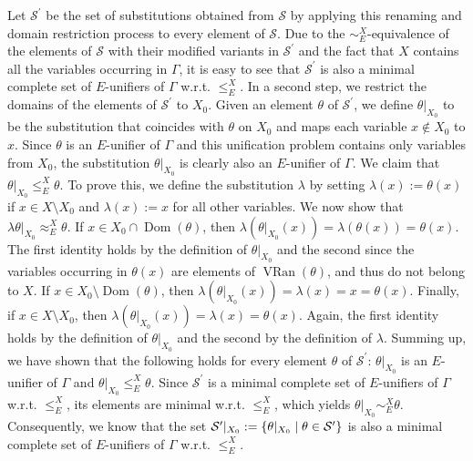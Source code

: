  
 
Let $\mathcal{S}^{\prime}$ be the set of substitutions obtained from $\mathcal{S}$ by applying this renaming and domain restriction process to every element of $\mathcal{S}$. Due to the $\sim_{E}^{X}$-equivalence of the elements of $\mathcal{S}$ with their modified variants in $\mathcal{S}^{\prime}$ and the fact that $X$ contains all the variables occurring in $\Gamma$, it is easy to see that $\mathcal{S}^{\prime}$ is also a minimal complete set of $E$-unifiers of $\Gamma$ w.r.t. $\leq_{E}^{X}$. In a second step, we restrict the domains of the elements of $\mathcal{S}^{\prime}$ to $X_{0}$. Given an element $\theta$ of $\mathcal{S}^{\prime}$, we define $\theta|_{X_{0}}$ to be the substitution that coincides with $\theta$ on $X_{0}$ and maps each variable $x\not\in X_{0}$ to $x$. Since $\theta$ is an $E$-unifier of $\Gamma$ and this unification problem contains only variables from $X_{0}$, the substitution $\theta|_{X_{0}}$ is clearly also an $E$-unifier of $\Gamma$. We claim that $\theta|_{X_{0}}\leq_{E}^{X}\theta$. To prove this, we define the substitution $\lambda$ by setting $\lambda(x):=\theta(x)$ if $x\in X\setminus X_{0}$ and $\lambda(x):=x$ for all other variables. We now show that $\lambda\theta|_{X_{0}}\approx_{E}^{X}\theta$. If $x\in X_{0}\cap\operatorname{Dom}(\theta)$, then $\lambda(\theta|_{X_{0}}(x))=\lambda(\theta(x))=\theta(x)$. The first identity holds by the definition of $\theta|_{X_{0}}$ and the second since the variables occurring in $\theta(x)$ are elements of $\operatorname{VRan}(\theta)$, and thus do not belong to $X$. If $x\in X_{0}\setminus\operatorname{Dom}(\theta)$, then $\lambda(\theta|_{X_{0}}(x))=\lambda(x)=x=\theta(x)$. Finally, if $x\in X\setminus X_{0}$, then $\lambda(\theta|_{X_{0}}(x))=\lambda(x)=\theta(x)$. Again, the first identity holds by the definition of $\theta|_{X_{0}}$ and the second by the definition of $\lambda$. Summing up, we have shown that the following holds for every element $\theta$ of $\mathcal{S}^{\prime}$: $\theta|_{X_{0}}$ is an $E$-unifier of $\Gamma$ and $\theta|_{X_{0}}\leq_{E}^{X}\theta$. Since $\mathcal{S}^{\prime}$ is a minimal complete set of $E$-unifiers of $\Gamma$ w.r.t. $\leq_{E}^{X}$, its elements are minimal w.r.t. $\leq_{E}^{X}$, which yields $\theta|_{X_{0}}\sim_{E}^{X}\theta$. Consequently, we know that the set $\mathcal{S}^{\prime}|_{X_{0}}:=\{\theta|_{X_{0}}\mid\theta\in\mathcal{S}^{%
\prime}\}$ is also a minimal complete set of $E$-unifiers of $\Gamma$ w.r.t. $\leq_{E}^{X}$.\par
 
